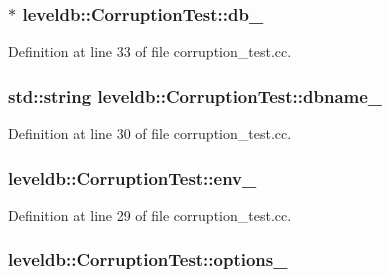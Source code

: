 \subsubsection[{db\+\_\+}]{$\ast$ leveldb\+::\+Corruption\+Test\+::db\+\_\+}\label{classleveldb_1_1_corruption_test_a8bfd06bc0008cddb00e9492648bfca79}


Definition at line 33 of file corruption\+\_\+test.\+cc.

\hypertarget{classleveldb_1_1_corruption_test_a533997a5fb977df165da8d92b6e9914a}{}
\subsubsection[{dbname\+\_\+}]{\setlength{\rightskip}{0pt plus 5cm}std\+::string leveldb\+::\+Corruption\+Test\+::dbname\+\_\+}\label{classleveldb_1_1_corruption_test_a533997a5fb977df165da8d92b6e9914a}


Definition at line 30 of file corruption\+\_\+test.\+cc.

\hypertarget{classleveldb_1_1_corruption_test_a9ea05b88e4240ace348f542b43d59281}{}
\subsubsection[{env\+\_\+}]{ leveldb\+::\+Corruption\+Test\+::env\+\_\+}\label{classleveldb_1_1_corruption_test_a9ea05b88e4240ace348f542b43d59281}


Definition at line 29 of file corruption\+\_\+test.\+cc.

\hypertarget{classleveldb_1_1_corruption_test_a6d639ef3ec7f1009447b85f9a10f90ac}{}
\subsubsection[{options\+\_\+}]{ leveldb\+::\+Corruption\+Test\+::options\+\_\+}\label{classleveldb_1_1_corruption_test_a6d639ef3ec7f1009447b85f9a10f90ac}


